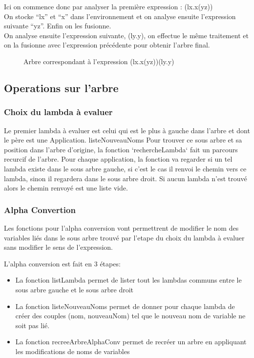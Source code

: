 \documentclass[a4paper,11pt,titlepage]{article}
\begin{document}
\newpage
Ici on commence donc par analyser la première expression : (lx.x(yz))\\
On stocke ``lx'' et ``x'' dans l'environnement et on analyse ensuite l'expression suivante ``yz''. Enfin on les fusionne.\\

On analyse ensuite l'expression suivante, (ly.y), on effectue le même traitement et on la fusionne avec l'expression précédente pour obtenir l'arbre final.
\begin{figure}[H]
\centering
  {
	 {{
		 {
			  {
			   {}
			   {
			      {{}
			       {}}
			   }
			  }
		 }
	 }
	{
		{}


	}}
  }
\caption{Arbre correspondant à l'expression (lx.x(yz))(ly.y)}
 \label{tree3}
\end{figure}


\subsection{Operations sur l'arbre}

\subsubsection{Choix du lambda à evaluer}

Le premier lambda à evaluer est celui qui est le plus à gauche dans l'arbre et dont le père est une Application.
listeNouveauNoms
Pour trouver ce sous arbre et sa position dans l'arbre d'origine, la fonction `rechercheLambda` fait un parcours recurcif de l'arbre.
Pour chaque application, la fonction va regarder si un tel lambda existe dans le sous arbre gauche, si c'est le cas il renvoi le chemin vers ce lambda,
 sinon il regardera dans le sous arbre droit. Si aucun lambda n'est trouvé alors le chemin renvoyé est une liste vide.

\subsubsection{Alpha Convertion}

Les fonctions pour l'alpha conversion vont permettrent de modifier le nom des variables liés dans le sous arbre trouvé par 
l'etape du choix du lambda à evaluer sans modifier le sens de l'expression.

L'alpha conversion est fait en 3 étapes:
\begin{itemize}
 \item La fonction listLambda permet de lister tout les lambdas communs entre le sous arbre gauche et le sous arbre droit
 \item La fonction listeNouveauNoms permet de donner pour chaque lambda de créer des couples (nom, nouveauNom) tel que le nouveau
nom de variable ne soit pas lié.
 \item La fonction recreeArbreAlphaConv permet de recréer un arbre en appliquant les modifications de noms de variables
\end{itemize}
\end{document}
